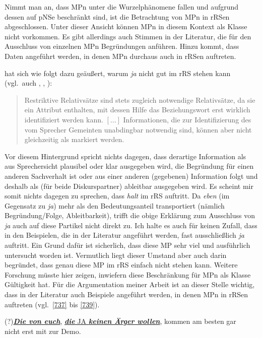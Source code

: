 Nimmt man an, dass MPn unter die Wurzelphänomene fallen und aufgrund dessen auf pNSe beschränkt sind, ist die Betrachtung von MPn in rRSen abgeschlossen. Unter dieser Ansicht können MPn in diesem Kontext als Klasse nicht vorkommen. Es gibt allerdings auch Stimmen in der Literatur, die für den Ausschluss von einzelnen MPn Begründungen anführen. Hinzu kommt, dass Daten angeführt werden, in denen MPn durchaus auch in rRSen auftreten.

\citet[160]{Hentschel1986} hat sich wie folgt dazu geäußert, warum \textit{ja} nicht gut im rRS stehen kann (vgl.\ auch \citealt[107]{Hartmann1977}, \citealt[210]{Rinas2006}, \citealt[52]{Kwon2005}):

\begin{quotation}
Restriktive Relativsätze sind stets zugleich notwendige Relativsätze, da sie ein Attribut enthalten, mit dessen Hilfe das Beziehungswort erst wirklich identifiziert werden kann. $[...]$ Informationen, die zur Identifizierung des vom Sprecher Gemeinten unabdingbar notwendig sind, können aber nicht gleichzeitig als  markiert werden.
\end{quotation}
Vor diesem Hintergrund spricht nichts dagegen, dass derartige Information als aus Sprechersicht plausibel oder klar ausgegeben wird, die Begründung für einen anderen Sachverhalt ist oder aus einer anderen (gegebenen) Information folgt und deshalb als (für beide Diskurspartner) ableitbar ausgegeben wird. Es scheint mir somit nichts dagegen zu sprechen, dass \textit{halt} im rRS auftritt. Da \textit{eben} (im Gegensatz zu \textit{ja}) mehr als den Bedeutungsanteil  transportiert (nämlich Begründung/Folge, Ableitbarkeit), trifft die obige Erklärung zum Ausschluss von \textit{ja} auch auf diese Partikel nicht direkt zu. Ich halte es auch für keinen Zufall, dass in den Beispielen, die in der Literatur angeführt werden, fast ausschließlich \textit{ja} auftritt. Ein Grund dafür ist sicherlich, dass diese MP sehr viel und ausführlich untersucht worden ist. Vermutlich liegt dieser Umstand aber auch darin begründet, dass genau diese MP im rRS einfach nicht stehen kann. Weitere Forschung müsste hier zeigen, inwiefern diese Beschränkung für MPn als Klasse Gültigkeit hat. Für die Argumentation meiner Arbeit ist an dieser Stelle wichtig, dass in der Literatur auch Beispiele angeführt werden, in denen MPn in rRSen auftreten (vgl.\ \ref{737} bis \ref{739}).

\begin{exe}
	\ex\label{737} 
	(?)\ul{\textit{\textbf{Die von euch}}}, \ul{\textit{\textbf{die}} JA \textit{\textbf{keinen Ärger wollen}}}, kommen am besten gar \\nicht erst mit zur Demo.
	\hfill\hbox{\citet[202]{Hentschel1986}}
\end{exe}

